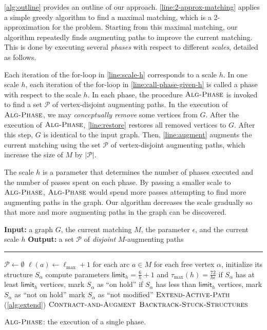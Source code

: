 \documentclass{article}
\newcommand{\alp}{\alpha}
\newcommand{\eps}{\epsilon}
\newcommand{\lmax}{\ell_{\max}}
\newcommand{\taumax}{\tau_{\max}}
\newcommand{\calP}{\mathcal{P}}
\newcommand{\bundle}{\text{pass-bundle}\xspace}
\newcommand{\limit}{\mathsf{limit}}
\newcommand{\algPhase}{\textsc{Alg-Phase}\xspace}
\newcommand{\algExtend}{\textsc{Extend-Active-Path}\xspace}
\newcommand{\algBacktrack}{\textsc{Backtrack-Stuck-Structures}\xspace}
\newcommand{\algCheck}{\textsc{Contract-and-Augment}\xspace}
\begin{document}
\cref{alg:outline} provides an outline of our approach.
\cref*{line:2-approx-matching} applies a simple greedy algorithm to find a maximal matching, which is a 2-approximation for the problem.
Starting from this maximal matching, our algorithm repeatedly finds augmenting paths to improve the current matching.
This is done by executing several \emph{phases} with respect to different \emph{scales}, detailed as follows.

Each iteration of the for-loop in \cref*{line:scale-h} corresponds to a scale $h$.
In one scale $h$, each iteration of the for-loop in \cref*{line:call-phase-given-h} is called a phase with respect to the scale $h$.
In each phase, the procedure $\algPhase$ is invoked to find a set $\calP$ of vertex-disjoint augmenting paths.
In the execution of $\algPhase$, we may \textit{conceptually remove} some vertices from $G$.
After the execution of $\algPhase$, \cref*{line:restore} restores all removed vertices to $G$.
After this step, $G$ is identical to the input graph.
Then, \cref*{line:augment} augments the current matching using the set $\calP$ of vertex-disjoint augmenting paths, which increase the size of $M$ by $|\calP|$.

The scale $h$ is a parameter that determines the number of phases executed and the number of passes spent on each phase.
By passing a smaller scale to $\algPhase$, $\algPhase$ would spend more passes attempting to find more augmenting paths in the graph.
Our algorithm decreases the scale gradually so that more and more augmenting paths in the graph can be discovered.

\begin{algorithm}
\begin{algorithmic}[1]
\medskip 
\Statex \textbf{Input:} a graph $G$, the current matching $M$, the parameter $\eps$, and the current scale $h$
\Statex \textbf{Output:} a set $\calP$ of \emph{disjoint} $M$-augmenting paths
\medskip
\Statex \hrule 

\State $\calP \gets \emptyset$ \label{line:init-empty}
\State $\ell(a) \gets \lmax + 1$ for each arc $a \in M$ \label{line:init-label}
\State for each free vertex $\alp$, initialize its structure $S_\alp$ \label{line:init-structure}
\State compute parameters $\limit_h = \frac{6}{h} + 1$ and $\taumax(h) = \frac{72}{h\eps}$ \label{line:compute-par}
\For{$\bundle$s $\tau = 1, 2, \dots, \taumax(h)$} \label{line:for-pass}
    \For {each free vertex $\alp$} \label{line:init-for}
        \State if $S_\alp$ has at least $\limit_h$ vertices, mark $S_\alp$ as ``on hold'' \label{line:hold}
        \State if $S_\alp$ has less than $\limit_h$ vertices, mark $S_\alp$ as ``not on hold'' \label{line:not-hold}
        \State mark $S_\alp$ as ``not modified'' \label{line:not-modified}
    \EndFor
    \State $\algExtend$ (\cref{alg:extend}) \label{line:extend}
    \State $\algCheck$ \label{line:check}
    \State $\algBacktrack$ \label{line:backtrack}
\EndFor
\State \Return
\end{algorithmic}
\caption{$\algPhase$: the execution of a single phase.
}
\label{alg:phase}
\end{algorithm}
\end{document}
